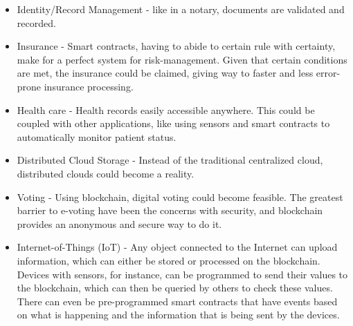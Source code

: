 
    \begin{itemize}
     \item Identity/Record Management - like in a notary, documents are validated and recorded.
     
     \item Insurance - Smart contracts, having to abide to certain rule with certainty, make for a perfect system for risk-management. Given that certain conditions are met, the insurance could be claimed, giving way to faster and less error-prone insurance processing.
     
     \item Health care - Health records easily accessible anywhere. This could be coupled with other applications, like using sensors and smart contracts to automatically monitor patient status.
     
     \item Distributed Cloud Storage - Instead of the traditional centralized cloud, distributed clouds could become a reality.
     
     \item Voting - Using blockchain, digital voting could become feasible. The greatest barrier to e-voting have been the concerns with security, and blockchain provides an anonymous and secure way to do it.
     
     \item Internet-of-Things (IoT) - Any object connected to the Internet can upload information, which can either be stored or processed on the blockchain. Devices with sensors, for instance, can be programmed to send their values to the blockchain, which can then be queried by others to check these values. There can even be pre-programmed smart contracts that have events based on what is happening and the information that is being sent by the devices.
	\end{itemize}
